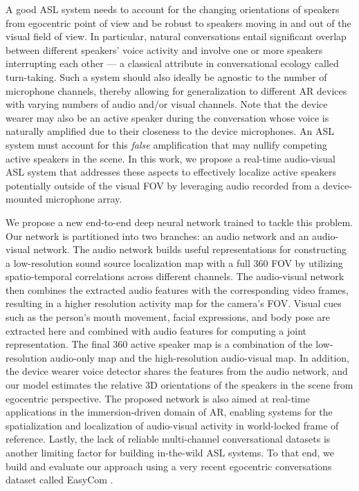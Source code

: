 \documentclass[10pt,twocolumn,letterpaper]{article}
\begin{document}
A good ASL system needs to account for the changing orientations of speakers from egocentric point of view
and be robust to speakers moving in and out of the visual field of view.
In particular, natural conversations entail significant overlap between different speakers' voice activity 
and involve one or more speakers interrupting each other --- a classical attribute in conversational ecology called turn-taking.    
Such a system should also ideally be agnostic to the number of microphone channels, 
thereby allowing for generalization to different AR devices with varying numbers of audio and/or visual channels.  
Note that the device wearer may also be an active speaker during the conversation whose voice is naturally amplified 
due to their closeness to the device microphones. 
An ASL system must account for this {\it false} amplification that may nullify competing active speakers in the scene.
In this work, we propose a real-time audio-visual ASL system that addresses these aspects to 
effectively localize active speakers potentially outside of the visual FOV by leveraging audio recorded from a device-mounted
microphone array. 

We propose a new end-to-end deep neural network trained to tackle this problem. 
Our network is partitioned into two branches: an audio network and an audio-visual network. 
The audio network builds useful representations for constructing a low-resolution sound source localization map with a full 360 FOV 
by utilizing spatio-temporal correlations across different channels. 
The audio-visual network then combines the extracted audio features with the corresponding video frames, 
resulting in a higher resolution activity map for the camera's FOV. 
Visual cues such as the person's mouth movement, facial expressions, and body pose are extracted here 
and combined with audio features for computing a joint representation. 
The final 360 active speaker map is a combination of the low-resolution audio-only map and the high-resolution audio-visual map.
In addition, the device wearer voice detector shares the features from the audio network, 
and our model estimates the relative 3D orientations of the speakers in the scene from egocentric perspective. 
The proposed network is also aimed at real-time applications in the immersion-driven domain of AR, 
enabling systems for the spatialization and localization of audio-visual activity in world-locked frame of reference.
Lastly, the lack of reliable multi-channel conversational datasets is another limiting factor for building in-the-wild ASL systems. 
To that end, we build and evaluate our approach using a very recent egocentric conversations dataset called EasyCom \cite{easycom}. 
\end{document}
